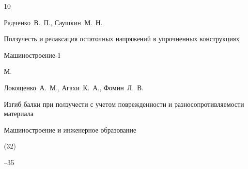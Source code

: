 \begin{thebibliography}{10}







\by Радченко~В.~П., Саушкин~М.~Н.

\book Ползучесть и релаксация  остаточных напряжений в упрочненных конструкциях


\publ Машиностроение-1

\publaddr М.













\by  Локощенко~А.~М., Агахи~К.~А., Фомин~Л.~В. 

\paper Изгиб балки при ползучести с учетом поврежденности и разносопротивляемости материала 

\jour Машиностроение и инженерное образование


(32)

--35









\end{thebibliography}
